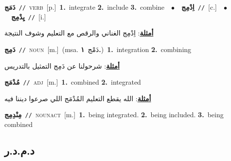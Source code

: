 \documentclass[10pt,a4paper,twoside]{article} %
\begin{document}
\begin{multicols}{2}
{\setlength\topsep{0pt}\textbf{\foreignlanguage{arabic}{دَمَج}}\ {\color{gray}\texttt{//}\color{black}}\ \textsc{verb}\ [p.]\ \textbf{1.}~integrate  \textbf{2.}~include  \textbf{3.}~combine\ \ $\bullet$\ \ \setlength\topsep{0pt}\textbf{\foreignlanguage{arabic}{اِدْمِج}}\ {\color{gray}\texttt{//}\color{black}}\ [c.]\ \ $\bullet$\ \ \setlength\topsep{0pt}\textbf{\foreignlanguage{arabic}{يِدْمِج}}\ {\color{gray}\texttt{//}\color{black}}\ [i.]\  \begin{flushright}\color{gray}\foreignlanguage{arabic}{\textbf{\underline{\foreignlanguage{arabic}{أمثلة}}}: اِدْمِج الغناني والرقص مع التعليم وشوف النتيجة}\end{flushright}\color{black}} \vspace{2mm}

{\setlength\topsep{0pt}\textbf{\foreignlanguage{arabic}{دَمِج}}\ {\color{gray}\texttt{//}\color{black}}\ \textsc{noun}\ [m.]\ \color{gray}(msa. \foreignlanguage{arabic}{دَمْج}~\foreignlanguage{arabic}{\textbf{١.}})\color{black}\ \textbf{1.}~integration  \textbf{2.}~combining\  \begin{flushright}\color{gray}\foreignlanguage{arabic}{\textbf{\underline{\foreignlanguage{arabic}{أمثلة}}}: شرحولنا عن دَمِج التمثيل بالتدريس}\end{flushright}\color{black}} \vspace{2mm}

{\setlength\topsep{0pt}\textbf{\foreignlanguage{arabic}{مُدْمَج}}\ {\color{gray}\texttt{//}\color{black}}\ \textsc{adj}\ [m.]\ \textbf{1.}~combined  \textbf{2.}~integrated\  \begin{flushright}\color{gray}\foreignlanguage{arabic}{\textbf{\underline{\foreignlanguage{arabic}{أمثلة}}}: الله يقطع التعليم المُدْمَج اللي صرعوا ديننا فيه}\end{flushright}\color{black}} \vspace{2mm}

{\setlength\topsep{0pt}\textbf{\foreignlanguage{arabic}{مِنْدِمِج}}\ {\color{gray}\texttt{//}\color{black}}\ \textsc{noun\textunderscore act}\ [m.]\ \textbf{1.}~being integrated.  \textbf{2.}~being included.  \textbf{3.}~being combined\ } \vspace{2mm}

\vspace{-3mm}
\subsection*{\color{blue}\foreignlanguage{arabic}{د.م.د.ر}\color{blue}{}} 


\end{multicols}
\end{document}

